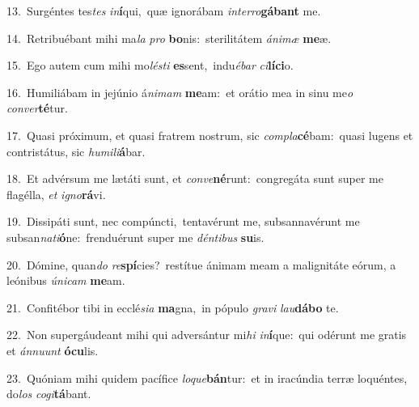 {\numbfont\textcolor{\numbcolor}{13.}}~Surgéntes tes\textit{tes} \textit{in}\-\textbf{í}qui,~\star quæ ignorábam \textit{in}\-\textit{ter}\textit{ro}\textbf{gá}\textbf{bant} me.\par
{\numbfont\textcolor{\numbcolor}{14.}}~Retribuébant mihi ma\textit{la} \textit{pro} \textbf{bo}\-nis:~\star sterilitátem \textit{á}\-\textit{ni}\textit{mæ} \textbf{me}\-æ.\par
{\numbfont\textcolor{\numbcolor}{15.}}~Ego autem cum mihi mo\-\textit{lés}\-\textit{ti} \textbf{es}\-sent,~\star indu\-\textit{é}\-\textit{bar} \textit{ci}\-\textbf{lí}\textbf{ci}o.\par
{\numbfont\textcolor{\numbcolor}{16.}}~Humiliábam in jejúnio á\-\textit{ni}\-\textit{mam} \textbf{me}\-am:~\star et orátio mea in sinu me\textit{o} \textit{con}\-\textit{ver}\textbf{té}tur.\par
{\numbfont\textcolor{\numbcolor}{17.}}~Quasi próximum, et quasi fratrem nostrum, sic \textit{com}\-\textit{pla}\textbf{cé}bam:~\star quasi lugens et contristátus, sic \textit{hu}\-\textit{mi}\textit{li}\textbf{á}bar.\par
{\numbfont\textcolor{\numbcolor}{18.}}~Et advérsum me lætáti sunt, et \textit{con}\-\textit{ve}\textbf{né}runt:~\star congregáta sunt super me flagélla, \textit{et} \textit{i}\-\textit{gno}\textbf{rá}vi.\par
{\numbfont\textcolor{\numbcolor}{19.}}~Dissipáti sunt, nec compúncti,~\dagger tentavérunt me, subsannavérunt me subsan\-\textit{na}\-\textit{ti}\textbf{ó}ne:~\star frenduérunt super me \textit{dén}\-\textit{ti}\textit{bus} \textbf{su}\-is.\par
{\numbfont\textcolor{\numbcolor}{20.}}~Dómine, quan\textit{do} \textit{re}\-\textbf{spí}cies?~\star restítue ánimam meam a malignitáte eórum, a leónibus \textit{ú}\-\textit{ni}\textit{cam} \textbf{me}\-am.\par
{\numbfont\textcolor{\numbcolor}{21.}}~Confitébor tibi in ecclé\-\textit{si}\-\textit{a} \textbf{ma}\-gna,~\star in pópulo \textit{gra}\-\textit{vi} \textit{lau}\-\textbf{dá}\textbf{bo} te.\par
{\numbfont\textcolor{\numbcolor}{22.}}~Non supergáudeant mihi qui adversántur mi\textit{hi} \textit{in}\-\textbf{í}que:~\star qui odérunt me gratis et \textit{án}\-\textit{nu}\textit{unt} \textbf{ó}\-\textbf{cu}lis.\par
{\numbfont\textcolor{\numbcolor}{23.}}~Quóniam mihi quidem pacífice \textit{lo}\-\textit{que}\textbf{bán}tur:~\star et in iracúndia terræ loquéntes, do\textit{los} \textit{co}\-\textit{gi}\textbf{tá}bant.\par
